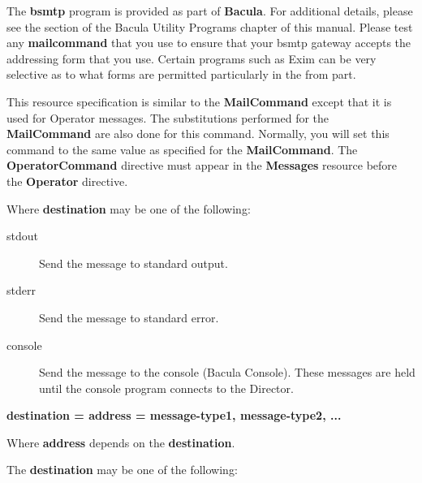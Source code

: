 \begin{description}
The {\bf bsmtp} program is provided as part of {\bf Bacula}.  For
additional details, please see the 
 section of
the  Bacula Utility Programs chapter of this manual. Please test any  {\bf
mailcommand} that you use to ensure that your bsmtp gateway accepts  the
addressing form that you use. Certain programs such as Exim can be very 
selective as to what forms are permitted particularly in the from part.  

\item [OperatorCommand = \lt{}command\gt{}]
   This resource specification is  similar to the {\bf MailCommand} except that
   it is used for Operator  messages. The substitutions performed for the {\bf
   MailCommand} are  also done for this command. Normally, you will set this
   command to the  same value as specified for the {\bf MailCommand}. 
   The {\bf OperatorCommand} directive must appear in the {\bf Messages}
   resource before the {\bf Operator} directive.

\item [\lt{}destination\gt{} = \lt{}message-type1\gt{},
   \lt{}message-type2\gt{}, ...]

Where {\bf destination} may be one of the following:  

\begin{description}

\item [stdout]
   Send the message to standard output.  

\item [stderr]
   Send the message to standard error.  

\item [console]
   Send the message to the console (Bacula Console).  These messages are held
until the console program  connects to the Director.  
\end{description}

\item {\bf \lt{}destination\gt{} = \lt{}address\gt{} =
   \lt{}message-type1\gt{}, \lt{}message-type2\gt{}, ...}

Where {\bf address} depends on the {\bf destination}. 

The {\bf destination} may be one of the following:  

\begin{description}


\end{description}
\end{description}
